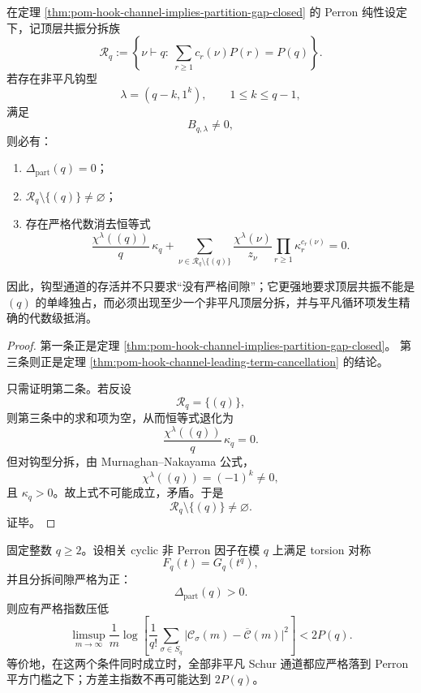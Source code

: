 \begin{theorem}[钩型存活所强制的顶层共振多重性]\label{thm:conclusion-hook-survival-forces-top-resonance-multiplicity}
在定理 \ref{thm:pom-hook-channel-implies-partition-gap-closed} 的 Perron 纯性设定下，记顶层共振分拆族
\[
\mathcal R_q:=
\left\{
\nu\vdash q:\ \sum_{r\ge 1}c_r(\nu)P(r)=P(q)
\right\}.
\]
若存在非平凡钩型
\[
\lambda=(q-k,1^k),
\qquad
1\le k\le q-1,
\]
满足
\[
B_{q,\lambda}\neq 0,
\]
则必有：
\begin{enumerate}
\normalfont
  \item \(\Delta_{\mathrm{part}}(q)=0\)；
  \item \(\mathcal R_q\setminus\{(q)\}\neq\varnothing\)；
  \item 存在严格代数消去恒等式
  \[
  \frac{\chi^\lambda((q))}{q}\,\kappa_q
  +
  \sum_{\nu\in\mathcal R_q\setminus\{(q)\}}
  \frac{\chi^\lambda(\nu)}{z_\nu}\prod_{r\ge 1}\kappa_r^{c_r(\nu)}
  =0.
  \]
\end{enumerate}
因此，钩型通道的存活并不只要求“没有严格间隙”；它更强地要求顶层共振不能是 \((q)\) 的单峰独占，而必须出现至少一个非平凡顶层分拆，并与平凡循环项发生精确的代数级抵消。
\end{theorem}
\begin{proof}
第一条正是定理 \ref{thm:pom-hook-channel-implies-partition-gap-closed}。
第三条则正是定理 \ref{thm:pom-hook-channel-leading-term-cancellation} 的结论。

只需证明第二条。若反设
\[
\mathcal R_q=\{(q)\},
\]
则第三条中的求和项为空，从而恒等式退化为
\[
\frac{\chi^\lambda((q))}{q}\,\kappa_q=0.
\]
但对钩型分拆，由 Murnaghan--Nakayama 公式，
\[
\chi^\lambda((q))=(-1)^k\neq 0,
\]
且 \(\kappa_q>0\)。故上式不可能成立，矛盾。于是
\[
\mathcal R_q\setminus\{(q)\}\neq\varnothing.
\]
证毕。
\end{proof}

\begin{conjecture}\label{conj:conclusion-torsion-flatness-strict-gap-double-rigidity}
固定整数 \(q\ge 2\)。设相关 cyclic 非 Perron 因子在模 \(q\) 上满足 torsion 对称
\[
F_q(t)=G_q(t^q),
\]
并且分拆间隙严格为正：
\[
\Delta_{\mathrm{part}}(q)>0.
\]
则应有严格指数压低
\[
\limsup_{m\to\infty}
\frac{1}{m}
\log\!\left[
\frac{1}{q!}\sum_{\sigma\in S_q}\bigl|\mathcal C_\sigma(m)-\overline{\mathcal C}(m)\bigr|^2
\right]
<
2P(q).
\]
等价地，在这两个条件同时成立时，全部非平凡 Schur 通道都应严格落到 Perron 平方门槛之下；方差主指数不再可能达到 \(2P(q)\)。
\end{conjecture}
